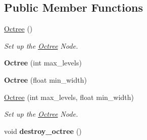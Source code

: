 \subsection*{Public Member Functions}
\begin{CompactItemize}
\item 
\hyperlink{class_octree_5a8d6069e6a7848f8f1df2a4975cd446}{Octree} ()
\begin{CompactList}\small\item\em Set up the \hyperlink{class_octree}{Octree} Node. \item\end{CompactList}\item 
\hypertarget{class_octree_53a9d3f5b99977ece75cc5e00c4e9aed}{
\textbf{Octree} (int max\_\-levels)}
\label{class_octree_53a9d3f5b99977ece75cc5e00c4e9aed}

\item 
\hypertarget{class_octree_9e3744a765883d1d20f345a4336fc639}{
\textbf{Octree} (float min\_\-width)}
\label{class_octree_9e3744a765883d1d20f345a4336fc639}

\item 
\hyperlink{class_octree_1fba0564f41c14943a79fc874e92a60d}{Octree} (int max\_\-levels, float min\_\-width)
\begin{CompactList}\small\item\em Set up the \hyperlink{class_octree}{Octree} Node. \item\end{CompactList}\item 
\hypertarget{class_octree_ed978900fdafcf488b852f15d7690f42}{
void \textbf{destroy\_\-octree} ()}
\label{class_octree_ed978900fdafcf488b852f15d7690f42}


\end{CompactItemize}
